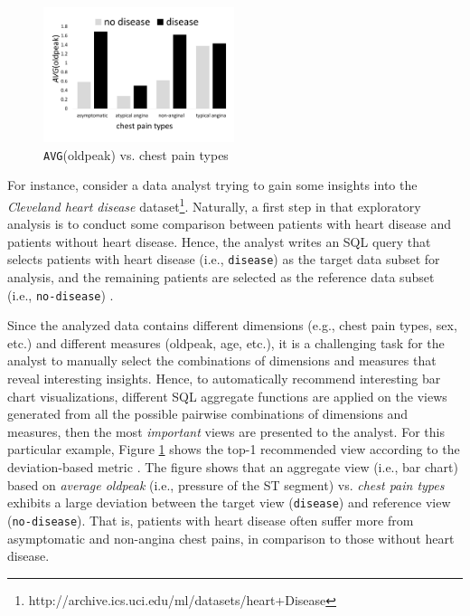 \begin{figure}
	\includegraphics[width=2.2in]{figures/introduction/cp_avg_oldpeak}
	\vspace{-10pt}
	\caption{{\tt AVG}(oldpeak) vs. chest pain types}
	\label{fig:intro1}
	\vspace{-15pt}
\end{figure}



For instance, consider a data analyst trying to gain some insights into the {\em Cleveland heart disease} dataset\footnote{http://archive.ics.uci.edu/ml/datasets/heart+Disease}. 
%
Naturally, a first step in that exploratory analysis is to conduct some comparison between patients with heart disease and patients without heart disease.
%
Hence, the analyst writes an SQL query that selects patients with heart disease (i.e., {\tt disease}) as the target data subset for analysis, and the remaining patients are selected as the reference data subset (i.e., {\tt no-disease}) .

Since the analyzed data contains different dimensions (e.g., chest pain types, sex, etc.) and different measures (oldpeak, age, etc.), it is a challenging task for the analyst to manually select the combinations of dimensions and measures that reveal interesting insights.
%
Hence, to automatically recommend interesting bar chart visualizations, different SQL aggregate functions are applied on the views generated from all the possible pairwise combinations of dimensions and measures, then the most {\em important} views are presented to the analyst.
%
For this particular example, Figure \ref{fig:intro1} shows the top-1 recommended view according to the deviation-based metric \cite{Vartak2015, Vartak2014}. 
%
The figure shows that an aggregate view (i.e., bar chart) based on {\it average oldpeak} (i.e.,  pressure of the ST segment) vs. {\it chest pain types} exhibits a large deviation between the target view ({\tt disease}) and reference view ({\tt no-disease}). 
%
That is, patients with heart disease often suffer more from asymptomatic and non-angina chest pains, in comparison to those without heart disease.  

